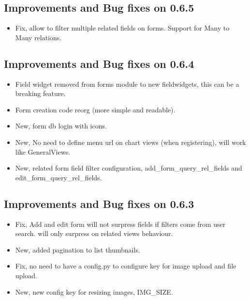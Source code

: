 \documentclass[letterpaper,10pt,english]{sphinxmanual}
\begin{document}
\subsection{Improvements and Bug fixes on 0.6.5}
\label{versions:improvements-and-bug-fixes-on-0-6-5}\begin{itemize}
\item {} 
Fix, allow to filter multiple related fields on forms. Support for Many to Many relations.

\end{itemize}


\subsection{Improvements and Bug fixes on 0.6.4}
\label{versions:improvements-and-bug-fixes-on-0-6-4}\begin{itemize}
\item {} 
Field widget removed from forms module to new fieldwidgets, this can be a breaking feature.

\item {} 
Form creation code reorg (more simple and readable).

\item {} 
New, form db login with icons.

\item {} 
New, No need to define menu url on chart views (when registering), will work like GeneralViews.

\item {} 
New, related form field filter configuration, add\_form\_query\_rel\_fields and edit\_form\_query\_rel\_fields.

\end{itemize}


\subsection{Improvements and Bug fixes on 0.6.3}
\label{versions:improvements-and-bug-fixes-on-0-6-3}\begin{itemize}
\item {} 
Fix, Add and edit form will not surpress fields if filters come from user search. will only surpress on related views behaviour.

\item {} 
New, added pagination to list thumbnails.

\item {} 
Fix, no need to have a config.py to configure key for image upload and file upload.

\item {} 
New, new config key for resizing images, IMG\_SIZE.

\end{itemize}
\end{document}
